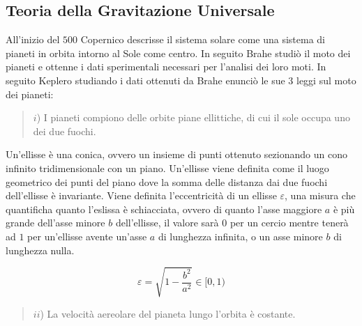 \documentclass{article}
\numberwithin{equation}{subsection}
\begin{document}
\begin{center}
\end{center}

\subsection{Teoria della Gravitazione Universale}

All'inizio del $500$ Copernico descrisse il sistema solare come una sistema di pianeti in orbita intorno al Sole come centro. In seguito Brahe studiò 
il moto dei pianeti e ottenne i dati sperimentali necessari per l'analisi dei loro moti. In seguito Keplero studiando i dati ottenuti da Brahe 
enunciò le sue $3$ leggi sul moto dei pianeti:

\begin{quotation}
    $i$) I pianeti compiono delle orbite piane ellittiche, di cui il sole occupa uno dei due fuochi.
\end{quotation}

Un'ellisse è una conica, ovvero un insieme di punti ottenuto sezionando un cono infinito tridimensionale con un piano. Un'ellisse viene definita 
come il luogo geometrico dei punti del piano dove la somma delle distanza dai due fuochi dell'ellisse è invariante. Viene definita l'eccentricità 
di un ellisse $\varepsilon$, una misura che quantificha quanto l'eslissa è schiacciata, ovvero di quanto l'asse maggiore $a$ è più grande dell'asse 
minore $b$ dell'ellisse, il valore sarà $0$ per un cercio mentre tenerà ad $1$ per un'ellisse avente un'asse $a$ di lunghezza infinita, o un asse minore $b$ di lunghezza nulla. 

\begin{equation*}
    \varepsilon=\sqrt{1-\displaystyle\frac{b^2}{a^2}}\in[0,1)
\end{equation*}

\begin{quotation}
    $ii$) La velocità aereolare del pianeta lungo l'orbita è costante. 
\end{quotation}
\end{document}
